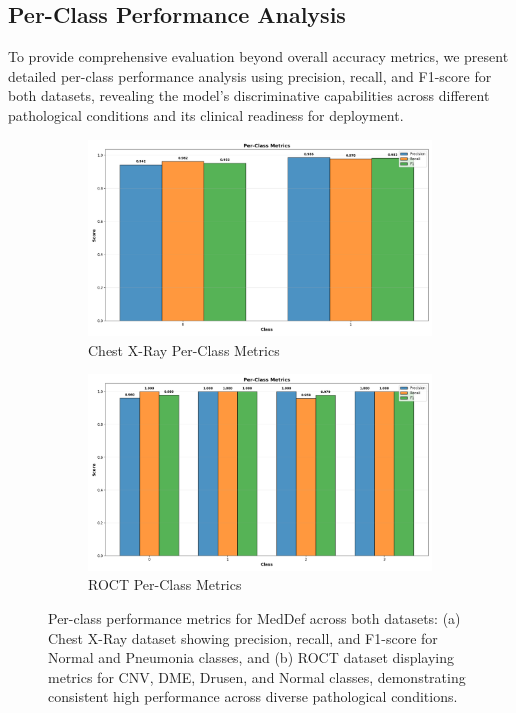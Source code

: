 \documentclass[preprint,12pt]{elsarticle}
\begin{document}
\subsection{Per-Class Performance Analysis}
To provide comprehensive evaluation beyond overall accuracy metrics, we present detailed per-class performance analysis using precision, recall, and F1-score for both datasets, revealing the model's discriminative capabilities across different pathological conditions and its clinical readiness for deployment.

\begin{figure}[!t]
\centering
\begin{subfigure}[b]{0.45\columnwidth}
\centering
\includegraphics[width=\columnwidth]{fig/per-class/chest_xray.png}
\caption{Chest X-Ray Per-Class Metrics}
\end{subfigure}
\hfill
\begin{subfigure}[b]{0.45\columnwidth}
\centering
\includegraphics[width=\columnwidth]{fig/per-class/roct.png}
\caption{ROCT Per-Class Metrics}
\end{subfigure}
\caption{Per-class performance metrics for MedDef across both datasets: (a) Chest X-Ray dataset showing precision, recall, and F1-score for Normal and Pneumonia classes, and (b) ROCT dataset displaying metrics for CNV, DME, Drusen, and Normal classes, demonstrating consistent high performance across diverse pathological conditions.}
\label{fig:per_class_metrics}
\end{figure}
\end{document}
